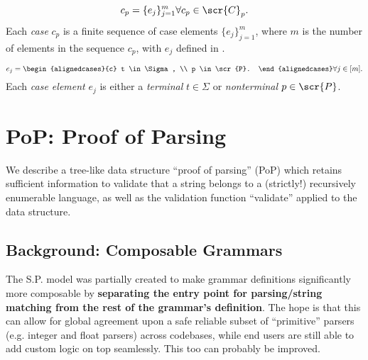\documentclass[10pt]{article}
\begin{document}
\begin{equation}
  \label{eq:cp}
  c_p = \{e_j\}_{j=1}^m \forall c_p \in \scr{C}_p.
\end{equation}
Each \textit{case} $c_p$ is a finite sequence of case elements $\{e_j\}_{j=1}^m$, where $m$ is the number of elements in the sequence $c_p$, with $e_j$ defined in .

\begin{equation}
  \label{eq:ej}
  e_j = \begin{alignedcases}{c}
    t \in \Sigma, \\
    p \in \scr{P}.
  \end{alignedcases} \forall j \in [m].
\end{equation}
Each \textit{case element} $e_j$ is either a \textit{terminal} $t \in \Sigma$ or \textit{nonterminal} $p \in \scr{P}$.

\section{PoP: Proof of Parsing}
\label{sec:proof-of-parsing}
We describe a tree-like data structure ``proof of parsing'' (PoP) which retains sufficient information to validate that a string belongs to a (strictly!) recursively enumerable language, as well as the validation function ``validate'' applied to the data structure.

\subsection{Background: Composable Grammars}
\label{sec:background-composable-grammars}
The S.P. model was partially created to make grammar definitions significantly more composable by \textbf{separating the entry point for parsing/string matching from the rest of the grammar's definition}. The hope is that this can allow for global agreement upon a safe reliable subset of ``primitive'' parsers (e.g. integer and float parsers) across codebases, while end users are still able to add custom logic on top seamlessly. This too can probably be improved.

\end{document}
